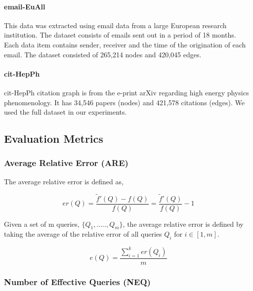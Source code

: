 \paragraph{email-EuAll\cite{leskovec_graph_2007}}
This data was extracted using email data from a large European research institution. The dataset consists of emails sent out in a period of 18 months. Each data item contains sender, receiver and the time of the origination of each email. The dataset consisted of 265,214 nodes and 420,045 edges\cite{noauthor_snap_nodate_email}. 

\paragraph{cit-HepPh\cite{gehrke_overview_2003}}
cit-HepPh citation graph is from the e-print arXiv regarding high energy physics phenomenology. It has 34,546 papers (nodes) and 421,578 citations (edges). We used the full dataset in our experiments. 

\subsection{Evaluation Metrics}
\label{section:design_evaluation_metrics}

\subsubsection{Average Relative Error (ARE)}
\label{section:metrics_are}

The average relative error is defined as,

\begin{equation}
    er(Q) =  \frac{\tilde{f}'(Q) - f(Q)}{f(Q)} = \frac{\tilde{f}'(Q)}{f(Q)} -1
\end{equation}

Given a set of m queries, $\{ Q_1 , ....., Q_m \}$, the average relative error is defined by taking the average of the relative error of all queries $Q_i$ for \(i \in [1,m]\).

\begin{equation}
    e(Q) =  \frac{\sum_{i=1}^{k} er(Q_i)}{m}
\end{equation}

\subsubsection{Number of Effective Queries (NEQ)}
\label{section:metrics_neq}

